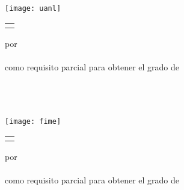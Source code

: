 \thispagestyle{empty}

\begin{scshape}
\begin{center}
	{\Large \uanl} \\[5mm]
	{\large \fime} \\[5mm]
	{\large \depg}
	\vskip15mm
	\texttt{[image: uanl]}
	\vskip12mm
	\begin{tabular}{p{11cm}}
		\centering
		{\large \titulo}
	\end{tabular}
	\vskip7mm
	{por}\\[7mm]
	{\large \autor}\\[7mm]
	{como requisito parcial para obtener el grado de}\\[3mm]
	\MakeUppercase{\grado}\\
	\orientacion
	\vfill
	\fecha
\end{center}
\end{scshape}

\newpage
\thispagestyle{empty}

\begin{scshape}
\begin{center}
	{\Large\uanl} \\[5mm]
	{\large\fime} \\[5mm]
	{\large\depg}
	\vskip16mm
	\texttt{[image: fime]}
	\vskip16mm
	\begin{tabular}{p{11cm}}
		\centering
		{\large \titulo}
	\end{tabular}
	\vskip7mm
	{por}\\[7mm]
	{\large \autor}\\[7mm]
	{como requisito parcial para obtener el grado de}\\[3mm]
	\MakeUppercase{\grado}\\
	\orientacion
	\vfill
	\fecha
\end{center}
\end{scshape}

\newpage
\thispagestyle{empty}
\enlargethispage{5mm}

